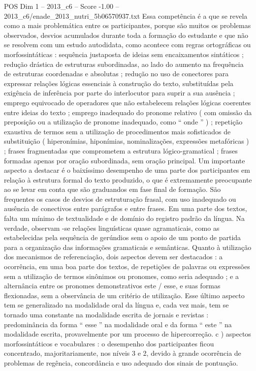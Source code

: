 \begin{textsample}{POS Dim 1 – 2013\_c6 – Score -1.00 – 2013\_c6/enade\_2013\_nutri\_5b06570937.txt}
Essa competência é a que se revela como a mais problemática entre os participantes, porque são muitos os problemas observados, desvios acumulados durante toda a formação do estudante e que não se resolvem com um estudo autodidata, como acontece com regras ortográficas ou morfossintáticas : sequência justaposta de ideias sem encaixamentos sintáticos ; redução drástica de estruturas subordinadas, ao lado do aumento na frequência de estruturas coordenadas e absolutas ; redução no uso de conectores para expressar relações lógicas essenciais à construção do texto, substituídas pela exigência de inferência por parte do interlocutor para suprir a sua ausência ; emprego equivocado de operadores que não estabelecem relações lógicas coerentes entre ideias do texto ; emprego inadequado do pronome relativo ( com omissão da preposição ou a utilização de pronome inadequado, como “ onde ” ) ; repetição exaustiva de termos sem a utilização de procedimentos mais sofisticados de substituição ( hiperonímias, hiponímias, nominalizações, expressões metafóricas ) ; frases fragmentadas que comprometem a estrutura lógico-gramatical ; frases formadas apenas por oração subordinada, sem oração principal.
Um importante aspecto a destacar é o baixíssimo desempenho de uma parte dos participantes em relação à estrutura formal do texto produzido, o que é extremamente preocupante ao se levar em conta que são graduandos em fase final de formação.
São frequentes os casos de desvios de estruturação frasal, com uso inadequado ou ausência de conectivos entre parágrafos e entre frases.
Em uma parte dos textos, falta um mínimo de textualidade e de domínio do registro padrão da língua.
Na verdade, observam -se relações linguísticas quase agramaticais, como as estabelecidas pela sequência de gerúndios sem o apoio de um ponto de partida para a organização das informações gramaticais e semânticas.
Quanto à utilização dos mecanismos de referenciação, dois aspectos devem ser destacados : a ocorrência, em uma boa parte dos textos, de repetições de palavras ou expressões sem a utilização de termos sinônimos ou pronomes, como seria adequado ; e a alternância entre os pronomes demonstrativos este / esse, e suas formas flexionadas, sem a observância de um critério de utilização.
Esse último aspecto tem se generalizado na modalidade oral da língua e, cada vez mais, tem se tornado uma constante na modalidade escrita de jornais e revistas : predominância da forma “ esse ” na modalidade oral e da forma “ este ” na modalidade escrita, provavelmente por um processo de hipercorreção. c ) aspectos morfossintáticos e vocabulares : o desempenho dos participantes ficou concentrado, majoritariamente, nos níveis 3 e 2, devido à grande ocorrência de problemas de regência, concordância e uso adequado dos sinais de pontuação.

\end{textsample}
